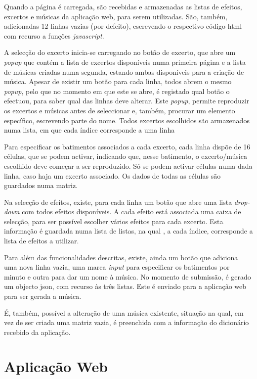 \documentclass{report}
\begin{document}
Quando a página é carregada, são recebidas e armazenadas as listas de efeitos, excertos e músicas da aplicação web, para serem utilizadas. São, também, adicionadas 12 linhas vazias (por defeito), escrevendo o respectivo código html com recurso a funções \textit{javascript}.

A selecção do excerto inicia-se carregando no botão de excerto, que abre um \textit{popup} que contém a lista de excertos disponíveis numa primeira página e a lista de músicas criadas numa segunda, estando ambas disponíveis para a criação de música. Apesar de existir um botão para cada linha, todos abrem o mesmo \textit{popup}, pelo que no momento em que este se abre, é registado qual botão o efectuou, para saber qual das linhas deve alterar. Este \textit{popup}, permite reproduzir os excertos e músicas antes de seleccionar e, também, procurar um elemento específico, escrevendo parte do nome. Todos excertos escolhidos são armazenados numa lista, em que cada índice corresponde a uma linha

Para especificar os batimentos associados a cada excerto, cada linha dispõe de 16 células, que se podem activar, indicando que, nesse batimento, o excerto/música escolhido deve começar a ser reproduzido. Só se podem activar células numa dada linha, caso haja um excerto associado. Os dados de todas as células são guardados numa matriz.

Na selecção de efeitos, existe, para cada linha um botão que abre uma lista \textit{drop-down} com todos efeitos disponíveis. A cada efeito está associada uma caixa de selecção, para ser possível escolher vários efeitos para cada excerto. Esta informação é guardada numa lista de listas, na qual , a cada índice, corresponde a lista de efeitos a utilizar.

Para além das funcionalidades descritas, existe, ainda um botão que adiciona uma nova linha vazia, uma marca \textit{input} para especificar os batimentos por minuto e outra para dar um nome à música. No momento de submissão, é gerado um objecto json, com recurso às três listas. Este é enviado para a aplicação web para ser gerada a música.

É, também, possível a alteração de uma música existente, situação na qual, em vez de ser criada uma matriz vazia, é preenchida com a informação do dicionário recebido da aplicação.

\chapter{Aplicação Web}
\label{chap.api}
\end{document}
